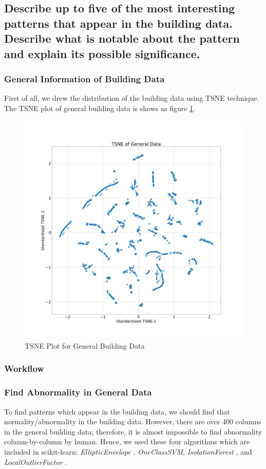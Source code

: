 \documentclass[aps, 10pt, a4paper]{article}
\begin{document}
        
        \subsection[Question 2]{Describe up to five of the most interesting patterns that appear in the building data. Describe what is notable about the pattern and explain its possible significance.}
            \subsubsection{General Information of Building Data}
                First of all, we drew the distribution of the building data using TSNE technique. The TSNE plot of general building data is shows as figure \ref{fig:generalbuilding}.
            
                \begin{figure}[htbp]
                    \centering
                    \includegraphics[width=0.3 \linewidth]{figures/TsneGeneral.png}
                    \caption{TSNE Plot for General Building Data}
                    \label{fig:generalbuilding}
                \end{figure}
            
            \subsubsection{Workflow}
 
            \subsubsection{Find Abnormality in General Data}       
                To find patterns which appear in the building data, we should find that normality/abnormality in the building data. However, there are over 400 columns in the general building data; therefore, it is almost impossible to find abnormality column-by-column by human. Hence, we used these four algorithms which are included in scikit-learn: \textit{EllipticEnvelope} \cite{ref:normal1}, \textit{OneClassSVM}, \textit{IsolationForest} \cite{ref:normal2, ref:normal3}, and \textit{LocalOutlierFactor} \cite{ref:normal4}.
            
\end{document}
